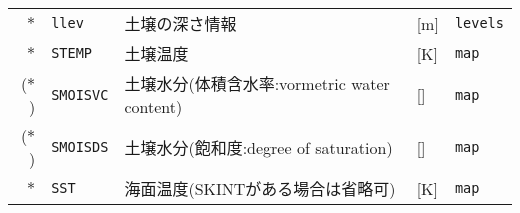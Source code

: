 {\begin{table}[hbt]
\begin{center}
\begin{tabularx}{150mm}{rl|l|l|X}
$\ast$ &\verb|llev|    & 土壌の深さ情報  & [m]      & \verb|levels| \\
$\ast$ &\verb|STEMP|   & 土壌温度        & [K]      & \verb|map| \\
($\ast$) &\verb|SMOISVC| & 土壌水分(体積含水率:vormetric water content) & [] & \verb|map| \\
($\ast$) &\verb|SMOISDS| & 土壌水分(飽和度:degree of saturation)        & [] & \verb|map| \\
$\ast$ &\verb|SST|     & 海面温度(SKINTがある場合は省略可) & [K] & \verb|map|\\
\end{tabularx}
\label{tab:grdvar_item}
\end{center}
\end{table}
}



~\\
~\\
